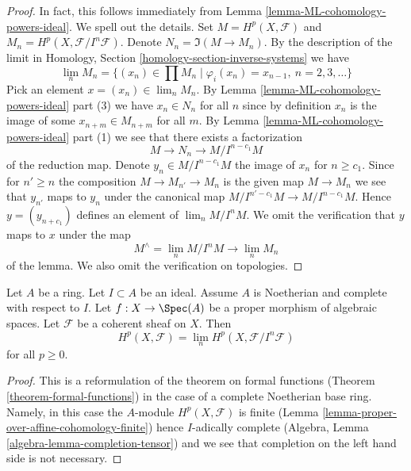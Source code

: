 \begin{proof}
In fact, this follows immediately from
Lemma \ref{lemma-ML-cohomology-powers-ideal}. We spell out the details.
Set $M = H^p(X, \mathcal{F})$ and $M_n = H^p(X, \mathcal{F}/I^n\mathcal{F})$.
Denote $N_n = \Im(M \to M_n)$.
By the description of the limit in Homology, Section
\ref{homology-section-inverse-systems} we have
$$
\lim_n M_n
=
\{(x_n) \in \prod M_n \mid \varphi_i(x_n) = x_{n - 1}, \ n = 2, 3, \ldots\}
$$
Pick an element $x = (x_n) \in \lim_n M_n$.
By Lemma \ref{lemma-ML-cohomology-powers-ideal} part (3)
we have $x_n \in N_n$ for all $n$ since by
definition $x_n$ is the image of some $x_{n + m} \in M_{n + m}$ for
all $m$. By Lemma \ref{lemma-ML-cohomology-powers-ideal} part (1)
we see that there exists a factorization
$$
M \to N_n \to M/I^{n - c_1}M
$$
of the reduction map. Denote $y_n \in M/I^{n - c_1}M$ the image of $x_n$
for $n \geq c_1$. Since for $n' \geq n$ the composition
$M \to M_{n'} \to M_n$ is the given map $M \to M_n$ we see that
$y_{n'}$ maps to $y_n$ under the canonical map
$M/I^{n' - c_1}M \to M/I^{n - c_1}M$. Hence $y = (y_{n + c_1})$
defines an element of $\lim_n M/I^nM$.
We omit the verification that $y$ maps to $x$ under the
map
$$
M^\wedge = \lim_n M/I^nM \longrightarrow \lim_n M_n
$$
of the lemma. We also omit the verification on topologies.
\end{proof}

\begin{lemma}
\label{lemma-spell-out-theorem-formal-functions}
Let $A$ be a ring. Let $I \subset A$ be an ideal. Assume $A$ is
Noetherian and complete with respect to $I$.
Let $f : X \to \Spec(A)$ be a proper morphism of algebraic spaces.
Let $\mathcal{F}$ be a coherent sheaf on $X$. Then
$$
H^p(X, \mathcal{F}) = \lim_n H^p(X, \mathcal{F}/I^n\mathcal{F})
$$
for all $p \geq 0$.
\end{lemma}

\begin{proof}
This is a reformulation of the theorem on formal functions
(Theorem \ref{theorem-formal-functions}) in the
case of a complete Noetherian base ring. Namely, in this case the
$A$-module $H^p(X, \mathcal{F})$ is finite
(Lemma \ref{lemma-proper-over-affine-cohomology-finite}) hence
$I$-adically complete (Algebra, Lemma \ref{algebra-lemma-completion-tensor})
and we see that completion on the left hand side is not necessary.
\end{proof}

